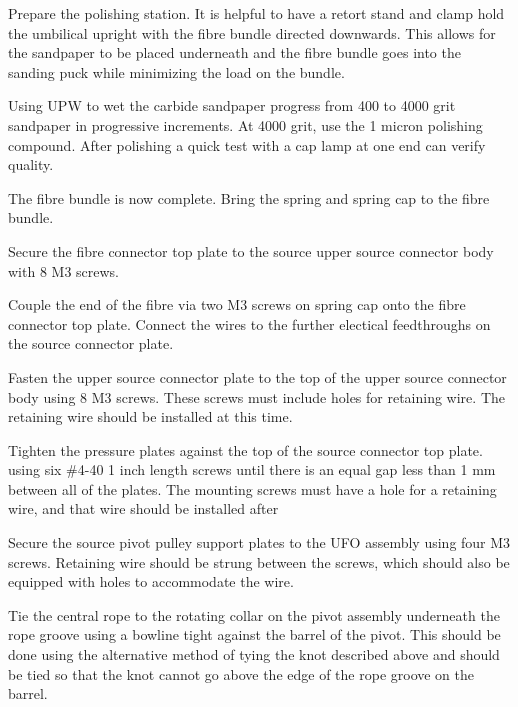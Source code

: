 \documentclass[11pt]{article}
\begin{document}
\begin{answerlist}
\item Prepare the polishing station. It is helpful to have a retort stand and clamp hold the umbilical upright with the fibre bundle directed downwards. This allows for the sandpaper to be placed underneath and the fibre bundle goes into the sanding puck while minimizing the load on the bundle.
\item Using UPW to wet the carbide sandpaper progress from 400 to 4000 grit sandpaper in progressive increments. At 4000 grit, use the 1 micron polishing compound. After polishing a quick test with a cap lamp at one end can verify quality.
\item The fibre bundle is now complete. Bring the spring and spring cap to the fibre bundle.
\item Secure the fibre connector top plate to the source upper source
  connector body with 8 M3 screws.
\item Couple the end of the fibre via two M3 screws on spring cap onto the fibre connector top plate. Connect the wires to the further electical feedthroughs on the source connector plate.
\item Fasten the upper source connector plate to the top of the upper source connector body using 8 M3 screws. These screws must include holes for retaining wire. The retaining wire should be installed at this time.
\item Tighten the pressure plates against the top of the source
  connector top plate.  using six \#4-40 1 inch length screws until
  there is an equal gap less than 1 mm between all of the plates. The
  mounting screws must have a hole for a retaining wire, and that wire
  should be installed after
\item Secure the source pivot pulley support plates to the UFO assembly using four M3 screws. Retaining wire should be strung between the screws, which should also be equipped with holes to accommodate the wire. 
\item Tie the central rope to the rotating collar on the pivot
  assembly underneath the rope groove using a bowline tight against
  the barrel of the pivot. This should be done using the alternative
  method of tying the knot described above and should be tied so that the knot cannot go above the edge of the rope groove on the barrel.
\end{answerlist}
\end{document}
